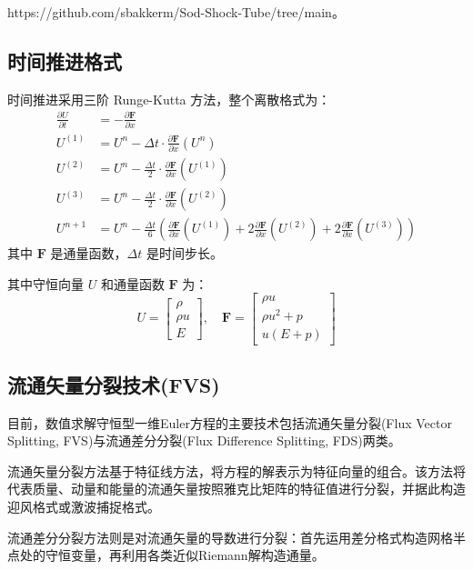 \documentclass[12pt,a4paper]{article}
\begin{document}
https://github.com/sbakkerm/Sod-Shock-Tube/tree/main。
\subsection{时间推进格式}
时间推进采用三阶 Runge-Kutta 方法，整个离散格式为：
\begin{align}
\frac{\partial U}{\partial t} &= -\frac{\partial \mathbf{F}}{\partial x} \\
U^{(1)} &= U^{n} - \Delta t \cdot \frac{\partial \mathbf{F}}{\partial x}(U^{n}) \\
U^{(2)} &= U^{n} - \frac{\Delta t}{2} \cdot \frac{\partial \mathbf{F}}{\partial x}(U^{(1)}) \\
U^{(3)} &= U^{n} - \frac{\Delta t}{2} \cdot \frac{\partial \mathbf{F}}{\partial x}(U^{(2)}) \\
U^{n+1} &= U^{n} - \frac{\Delta t}{6} \left( \frac{\partial \mathbf{F}}{\partial x}(U^{(1)}) + 2\frac{\partial \mathbf{F}}{\partial x}(U^{(2)}) + 2\frac{\partial \mathbf{F}}{\partial x}(U^{(3)}) \right)
\end{align}
其中 $\mathbf{F}$ 是通量函数，$\Delta t$ 是时间步长。

其中守恒向量 $U$ 和通量函数 $\mathbf{F}$ 为：
$$
U = \begin{bmatrix}
\rho \\
\rho u \\
E
\end{bmatrix},
\quad
\mathbf{F} = 
\begin{bmatrix}
\rho u \\
\rho u^{2} + p \\
u(E + p)
\end{bmatrix}
$$
\subsection{流通矢量分裂技术(FVS)}
目前，数值求解守恒型一维Euler方程的主要技术包括流通矢量分裂(Flux Vector Splitting, FVS)与流通差分分裂(Flux Difference Splitting, FDS)两类。

流通矢量分裂方法基于特征线方法，将方程的解表示为特征向量的组合。该方法将代表质量、动量和能量的流通矢量按照雅克比矩阵的特征值进行分裂，并据此构造迎风格式或激波捕捉格式。

流通差分分裂方法则是对流通矢量的导数进行分裂：首先运用差分格式构造网格半点处的守恒变量，再利用各类近似Riemann解构造通量。
\end{document}
